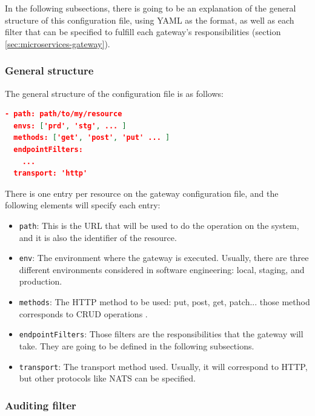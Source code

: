\documentclass[english, 12pt, a4paper, sci, utf8, a-1b, online]{aaltothesis}
\begin{document}
In the following subsections, there is going to be an explanation of the general structure of this configuration file, using YAML as the format, as well as each filter that can be specified to fulfill each gateway's responsibilities (section \ref{sec:microservices-gateway}).

\subsubsection*{General structure}

The general structure of the configuration file is as follows: \\

\clearpage

\begin{lstlisting}[language=json,firstnumber=1]
- path: path/to/my/resource
  envs: ['prd', 'stg', ... ]
  methods: ['get', 'post', 'put' ... ]
  endpointFilters:
    ...
  transport: 'http'
\end{lstlisting}

There is one entry per resource on the gateway configuration file, and the following elements will specify each entry:

\begin{itemize}
    \item \texttt{path}: This is the URL that will be used to do the operation on the system, and it is also the identifier of the resource.
    \item \texttt{env}: The environment where the gateway is executed. Usually, there are three different environments considered in software engineering: local, staging, and production.
    \item \texttt{methods}: The HTTP method to be used: put, post, get, patch... those method corresponds to CRUD operations \cite{martin1983managing}.
    \item \texttt{endpointFilters}: Those filters are the responsibilities that the gateway will take. They are going to be defined in the following subsections.
    \item \texttt{transport}: The transport method used. Usually, it will correspond to HTTP, but other protocols like NATS can be specified.
\end{itemize}

\subsubsection*{Auditing filter}
\end{document}
